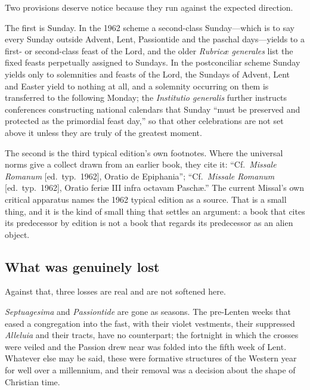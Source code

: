 Two provisions deserve notice because they run against the expected direction.

The first is Sunday. In the 1962 scheme a second-class Sunday---which is to say every Sunday outside Advent, Lent, Passiontide and the paschal days---yields to a first- or second-class feast of the Lord, and the older \emph{Rubricæ generales} list the fixed feasts perpetually assigned to Sundays. In the postconciliar scheme Sunday yields only to solemnities and feasts of the Lord, the Sundays of Advent, Lent and Easter yield to nothing at all, and a solemnity occurring on them is transferred to the following Monday; the \emph{Institutio generalis} further instructs conferences constructing national calendars that Sunday ``must be preserved and protected as the primordial feast day,'' so that other celebrations are not set above it unless they are truly of the greatest moment.

The second is the third typical edition's own footnotes. Where the universal norms give a collect drawn from an earlier book, they cite it: ``Cf.\ \emph{Missale Romanum} [ed.\ typ.\ 1962], Oratio de Epiphania''; ``Cf.\ \emph{Missale Romanum} [ed.\ typ.\ 1962], Oratio feriæ III infra octavam Paschæ.'' The current Missal's own critical apparatus names the 1962 typical edition as a source. That is a small thing, and it is the kind of small thing that settles an argument: a book that cites its predecessor by edition is not a book that regards its predecessor as an alien object.

\subsection{What was genuinely lost}

Against that, three losses are real and are not softened here.

\emph{Septuagesima} and \emph{Passiontide} are gone as seasons. The pre-Lenten weeks that eased a congregation into the fast, with their violet vestments, their suppressed \emph{Alleluia} and their tracts, have no counterpart; the fortnight in which the crosses were veiled and the Passion drew near was folded into the fifth week of Lent. Whatever else may be said, these were formative structures of the Western year for well over a millennium, and their removal was a decision about the shape of Christian time.

